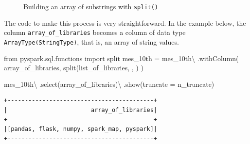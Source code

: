 \documentclass[
  11pt,
  letterpaper,
  DIV=11,
  numbers=noendperiod]{scrreprt}
\newenvironment{Shaded}{\begin{snugshade}}{\end{snugshade}}
\newcommand{\ImportTok}[1]{\textcolor[rgb]{0.00,0.46,0.62}{#1}}
\newcommand{\NormalTok}[1]{\textcolor[rgb]{0.00,0.23,0.31}{#1}}
\newcommand{\OperatorTok}[1]{\textcolor[rgb]{0.37,0.37,0.37}{#1}}
\newcommand{\StringTok}[1]{\textcolor[rgb]{0.13,0.47,0.30}{#1}}
\begin{document}
\begin{figure}


\caption{\label{fig-string-split}Building an array of substrings with
\texttt{split()}}

\end{figure}%

The code to make this process is very straightforward. In the example
below, the column \texttt{array\_of\_libraries} becomes a column of data
type \texttt{ArrayType(StringType)}, that is, an array of string values.

\begin{Shaded}
\begin{Highlighting}[]
\ImportTok{from}\NormalTok{ pyspark.sql.functions }\ImportTok{import}\NormalTok{ split}
\NormalTok{mes\_10th }\OperatorTok{=}\NormalTok{ mes\_10th}\OperatorTok{\textbackslash{}}
\NormalTok{    .withColumn(}
        \StringTok{\textquotesingle{}array\_of\_libraries\textquotesingle{}}\NormalTok{,}
\NormalTok{        split(}\StringTok{\textquotesingle{}list\_of\_libraries\textquotesingle{}}\NormalTok{, }\StringTok{\textquotesingle{}, \textquotesingle{}}\NormalTok{)}
\NormalTok{    )}

\NormalTok{mes\_10th}\OperatorTok{\textbackslash{}}
\NormalTok{    .select(}\StringTok{\textquotesingle{}array\_of\_libraries\textquotesingle{}}\NormalTok{)}\OperatorTok{\textbackslash{}}
\NormalTok{    .show(truncate }\OperatorTok{=}\NormalTok{ n\_truncate)}
\end{Highlighting}
\end{Shaded}

\begin{verbatim}
+------------------------------------------+
|                        array_of_libraries|
+------------------------------------------+
|[pandas, flask, numpy, spark_map, pyspark]|
+------------------------------------------+
\end{verbatim}
\end{document}
